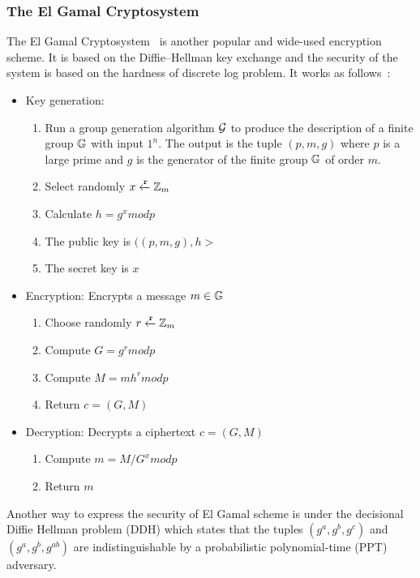 \subsubsection{The El Gamal Cryptosystem}
\label{preliminaries:crypto_block:pub:el_gamal}

The El Gamal Cryptosystem~\cite{el_gamal} is another popular and wide-used encryption scheme. It is based on the Diffie–Hellman key exchange and the security of the system is based on the hardness of discrete log problem. It works as follows~\cite{Katz:2014:IMC:2700550, kiagias:crypto}:

\begin{itemize}
  \item Key generation:
    \begin{enumerate}
        \item Run a group generation algorithm $\mathcal{G}$ to produce the description of a finite group $\mathbb{G}$ with input $1^{n}$. The output is the tuple $(p, m, g)$ where $p$ is a large prime and $g$ is the generator of the finite group $\mathbb{G}$ of order $m$.
        \item Select randomly $x \xleftarrow{\mathtt{r}}{\mathbb{Z}_m}$
        \item Calculate $h = g^{x}modp$
        \item The public key is $((p, m, g), h>$
        \item The secret key is $x$
    \end{enumerate}
  \item Encryption: Encrypts a message $m \in \mathbb{G}$
    \begin{enumerate}
      \item Choose randomly $r \xleftarrow{\mathtt{r}}{\mathbb{Z}_m}$
      \item Compute $G = g^{r}modp$
      \item Compute $M = mh^{r}modp$
      \item Return $c = (G, M)$
    \end{enumerate}
  \item Decryption: Decrypts a ciphertext $c = (G, M)$
    \begin{enumerate}
      \item Compute $m = M / G^{x} modp$
      \item Return $m$
    \end{enumerate}
\end{itemize}

Another way to express the security of El Gamal scheme is under the decisional Diffie Hellman problem (DDH) which states that the tuples $(g^a, g^b, g^c)$ and $(g^a, g^b, g^{ab})$ are indistinguishable by a probabilistic polynomial-time (PPT) adversary.

